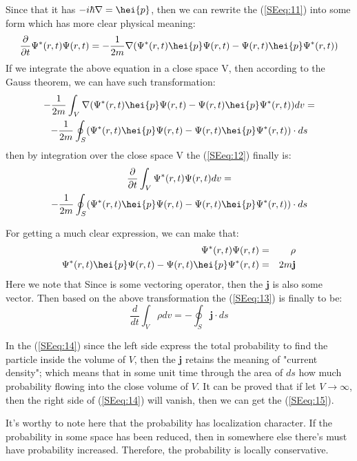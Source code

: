 Since that it has $-i\hbar\nabla = \hei{p}$, then we can rewrite the
(\ref{SEeq:11}) into some form which has more clear physical
meaning:
\begin{equation}\label{SEeq:12}
\frac{\partial}{\partial t}\Psi^{*}(r,t)\Psi(r,t) =
-\frac{1}{2m}\nabla(\Psi^{*}(r,t)\hei{p}\Psi(r,t)
-\Psi(r,t)\hei{p}\Psi^{*}(r,t))
\end{equation}
If we integrate the above equation in a close space V, then
according to the Gauss theorem, we can have such transformation:
\begin{multline}\label{}
-\frac{1}{2m}\int_{V}\nabla(\Psi^{*}(r,t)\hei{p}\Psi(r,t)
-\Psi(r,t)\hei{p}\Psi^{*}(r,t))dv = \\
-\frac{1}{2m}\oint_{S}(\Psi^{*}(r,t)\hei{p}\Psi(r,t)
-\Psi(r,t)\hei{p}\Psi^{*}(r,t))\cdot ds
\end{multline}
then by integration over the close space V the (\ref{SEeq:12})
finally is:
\begin{multline}\label{SEeq:13}
\frac{\partial}{\partial t}\int_{V}\Psi^{*}(r,t)\Psi(r,t)dv = \\
-\frac{1}{2m}\oint_{S}(\Psi^{*}(r,t)\hei{p}\Psi(r,t)
-\Psi(r,t)\hei{p}\Psi^{*}(r,t))\cdot ds
\end{multline}

For getting a much clear expression, we can make that:
\begin{eqnarray}
  \Psi^{*}(r,t)\Psi(r,t) &=& \rho \nonumber  \\
  \Psi^{*}(r,t)\hei{p}\Psi(r,t) -\Psi(r,t)\hei{p}\Psi^{*}(r,t) &=& 2m\mathbf{j}
\end{eqnarray}
Here we note that Since  is some vectoring operator, then
the $\mathbf{j}$ is also some vector. Then based on the above
transformation the (\ref{SEeq:13}) is finally to be:
\begin{equation}\label{SEeq:14}
\frac{d}{dt}\int_{V}\rho dv =-\oint_{S}\mathbf{j}\cdot ds
\end{equation}

In the (\ref{SEeq:14}) since the left side express the total
probability to find the particle inside the volume of $V$, then the
$\mathbf{j}$ retains the meaning of "current density"; which means
that in some unit time through the area of $ds$ how much probability
flowing into the close volume of $V$. It can be proved that if let
$V\rightarrow\infty$, then the right side of (\ref{SEeq:14}) will
vanish, then we can get the (\ref{SEeq:15}).


It's worthy to note here that the probability has localization
character. If the probability in some space has been reduced, then
in somewhere else there's must have probability increased.
Therefore, the probability is locally conservative.

